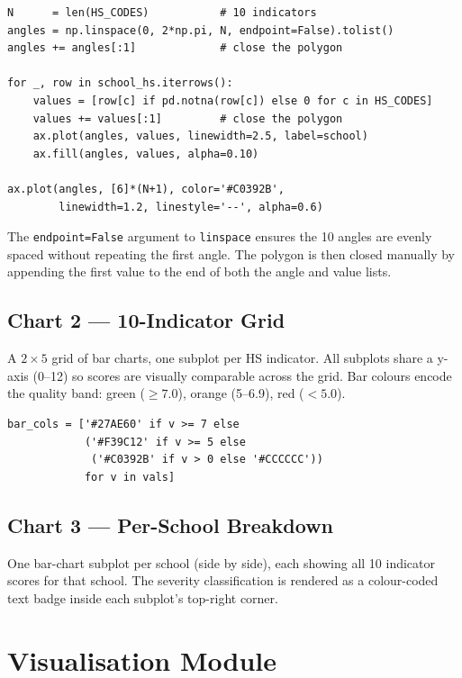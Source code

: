 \documentclass[11pt,a4paper,openany]{book}
\begin{document}
\begin{lstlisting}[style=python, caption={Radar chart construction (key steps).}]
N      = len(HS_CODES)           # 10 indicators
angles = np.linspace(0, 2*np.pi, N, endpoint=False).tolist()
angles += angles[:1]             # close the polygon

for _, row in school_hs.iterrows():
    values = [row[c] if pd.notna(row[c]) else 0 for c in HS_CODES]
    values += values[:1]         # close the polygon
    ax.plot(angles, values, linewidth=2.5, label=school)
    ax.fill(angles, values, alpha=0.10)

ax.plot(angles, [6]*(N+1), color='#C0392B',
        linewidth=1.2, linestyle='--', alpha=0.6)
\end{lstlisting}

The \texttt{endpoint=False} argument to \texttt{linspace} ensures the 10 angles are
evenly spaced without repeating the first angle.  The polygon is then closed manually
by appending the first value to the end of both the angle and value lists.

\subsection{Chart 2 --- 10-Indicator Grid}

A $2 \times 5$ grid of bar charts, one subplot per HS indicator.
All subplots share a y-axis (0--12) so scores are visually comparable across
the grid.  Bar colours encode the quality band: green ($\geq 7.0$),
orange (5--6.9), red ($< 5.0$).

\begin{lstlisting}[style=python, caption={Colour encoding in the indicator grid.}]
bar_cols = ['#27AE60' if v >= 7 else
            ('#F39C12' if v >= 5 else
             ('#C0392B' if v > 0 else '#CCCCCC'))
            for v in vals]
\end{lstlisting}

\subsection{Chart 3 --- Per-School Breakdown}

One bar-chart subplot per school (side by side), each showing all 10 indicator
scores for that school.  The severity classification is rendered as a colour-coded
text badge inside each subplot's top-right corner.

\section{Visualisation Module}
\end{document}
